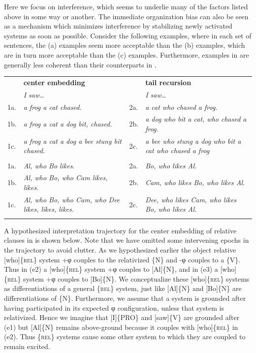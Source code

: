   Here we focus on interference, which seems to underlie many of the factors listed above in some way or another. The immediate organization bias can also be seen as a mechanism which minimizes interference by stabilizing newly activated systems as soon as possible. Consider the following examples, where in each set of sentences, the (a) examples seem more acceptable than the (b) examples, which are in turn more acceptable than the (c) examples. Furthermore, examples in  are generally less coherent than their counterparts in .  

\begin{tabularx}{\textwidth}{XXXX} & \textbf{center embedding} &  & \textbf{tail recursion}\\
\lsptoprule
& \textit{I saw…} &  & \textit{I saw…}\\
1a. & \textit{a frog a cat chased.} & 2a. & \textit{a cat who chased a frog.}\\
1b. & \textit{a frog a cat a dog bit, chased.} & 2b. & \textit{a dog who bit a cat, who chased a frog.}\\
1c. & \textit{a frog a cat a dog a bee stung bit chased.} & 2c. & \textit{a bee who stung a dog who bit a cat who chased a frog}\\
&  &  & \\
1a. & \textit{Al, who Bo likes.} & 2a. & \textit{Bo, who likes Al.}\\
1b. & \textit{Al, who Bo, who Cam likes, likes.} & 2b. & \textit{Cam, who likes Bo, who likes Al.}\\
1c. & \textit{Al, who Bo, who Cam, who Dee likes, likes, likes.} & 2c. & \textit{Dee, who likes Cam, who likes Bo, who likes Al.}\\
\lspbottomrule
\end{tabularx}
  A hypothesized interpretation trajectory for the center embedding of relative clauses in  is shown below. Note that we have omitted some intervening epochs in the trajectory to avoid clutter. As we hypothesized earlier the object relative [who]\{\textsc{rel}\} system +φ couples to the relativized \{N\} and -φ couples to a \{V\}. Thus in (e2) a [who]\{\textsc{rel}\} system +φ couples to [Al]\{N\}, and in (e3) a [who]\{\textsc{rel}\} system +φ couples to [Bo]\{N\}. We conceptualize these [who]\{\textsc{rel}\} systems as differentiations of a general \{\textsc{rel}\} system, just like [Al]\{N\} and [Bo]\{N\} are differentiations of \{N\}. Furthermore, we assume that a system is grounded after having participated in its expected φ configuration, unless that system is relativized. Hence we imagine that [I]\{\textsc{PRO}\} and [saw]\{V\} are grounded after (e1) but [Al]\{N\} remains above-ground because it couples with [who]\{\textsc{rel}\} in (e2). Thus \{\textsc{rel}\} systems cause some other system to which they are coupled to remain excited.

